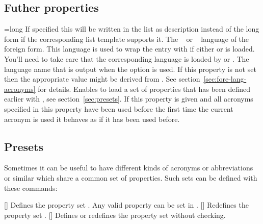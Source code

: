 \documentclass{acro-manual}
\begin{document}
\subsection{Futher properties}\label{sec:futher-properties}
\begin{properties}
  \Default={long}
    If specified this will be written in the list as description instead of
    the long form if the corresponding list template supports it.
  \Default
    The ~\cite{pkg:babel} or
    ~\cite{pkg:polyglossia} language of the foreign form.
    This language is used to wrap the entry with
     if either  or
     is loaded.  You'll need to take care that the
    corresponding language is loaded by  or .
  \Default
    The language name that is output when the option
    \code{/} is used.  If this property is not
    set then the appropriate value might be derived from
    . See section~\vref{sec:fore-lang-acronyms} for
    details.
  \Default
    Enables to load a set of properties that has been
    defined earlier with , see
    section~\vref{sec:presets}.
  \Default
    If this property is given and all acronyms specified in
    this property have been used before the first time the current acronym is
    used it behaves as if it has been used before.
\end{properties}

\subsection{Presets}\label{sec:presets}
Sometimes it can be useful to have different kinds of
acronyms or abbreviations or similar which share a common set of properties.
Such sets can be defined with these commands:
\begin{commands}
  []
    Defines the property set .  Any valid property can be set
    in .
  []
    Redefines the property set .
  []
    Defines or redefines the property set  without checking.
\end{commands}
\end{document}
